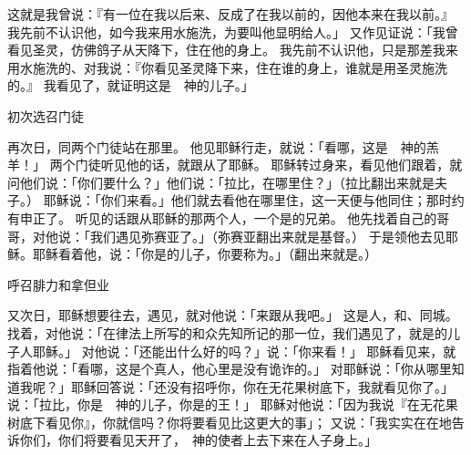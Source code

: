 {这就是我曾说：『有一位在我以后来、反成了在我以前的，因他本来在我以前。』
我先前不认识他，如今我来用水施洗，为要叫他显明给{}人。」
又作见证说：「我曾看见圣灵，仿佛鸽子从天降下，住在他的身上。
我先前不认识他，只是那差我来用水施洗的、对我说：『你看见圣灵降下来，住在谁的身上，谁就是用圣灵施洗的。』
我看见了，就证明这是　神的儿子。」
\par }{\SH 初次选召门徒
\par }{\PP {}再次日，{}同两个门徒站在那里。
他见耶稣行走，就说：「看哪，这是　神的羔羊！」
两个门徒听见他的话，就跟从了耶稣。
耶稣转过身来，看见他们跟着，就问他们说：「你们要什么？」他们说：「拉比，在哪里住？」（拉比翻出来就是夫子。）
耶稣说：「你们来看。」他们就去看他在哪里住，这一天便与他同住；那时约有申正了。
听见{}的话跟从耶稣的那两个人，一个是{}的兄弟{}。
他先找着自己的哥哥{}，对他说：「我们遇见弥赛亚了。」（弥赛亚翻出来就是基督。）
于是领他去见耶稣。耶稣看着他，说：「你是{}的儿子{}，你要称为{}。」（{}翻出来就是{}。）
\par }{\SH 呼召腓力和拿但业
\par }{\PP {}又次日，耶稣想要往{}去，遇见{}，就对他说：「来跟从我吧。」
这{}是{}人，和{}、{}同城。
找着{}，对他说：「{}在律法上所写的和众先知所记的那一位，我们遇见了，就是{}的儿子{}人耶稣。」
对他说：「{}还能出什么好的吗？」{}说：「你来看！」
耶稣看见{}来，就指着他说：「看哪，这是个真{}人，他心里是没有诡诈的。」
对耶稣说：「你从哪里知道我呢？」耶稣回答说：「{}还没有招呼你，你在无花果树底下，我就看见你了。」
说：「拉比，你是　神的儿子，你是{}的王！」
耶稣对他说：「因为我说『在无花果树底下看见你』，你就信吗？你将要看见比这更大的事」；
又说：「我实实在在地告诉你们，你们将要看见天开了，　神的使者上去下来在人子身上。」

}
